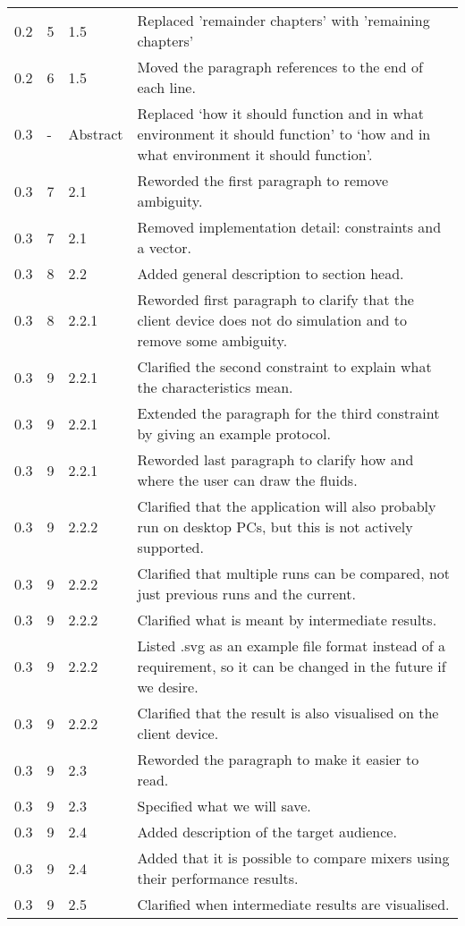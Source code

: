 \begin{tabular}{|l|l|l|p{11cm}|}
    0.2 & 5 & 1.5 & Replaced 'remainder chapters' with 'remaining chapters' \\
    0.2 & 6 & 1.5 & Moved the paragraph references to the end of each line. \\
    0.3 & - & Abstract & Replaced `how it should function and in what environment it should function' to `how and in what environment it should function'.\\
    0.3 & 7 & 2.1 & Reworded the first paragraph to remove ambiguity. \\
    0.3 & 7 & 2.1 & Removed implementation detail: constraints and a vector. \\
    0.3 & 8 & 2.2 & Added general description to section head. \\
    0.3 & 8 & 2.2.1 & Reworded first paragraph to clarify that the client device does not do simulation and to remove some ambiguity. \\
    0.3 & 9 & 2.2.1 & Clarified the second constraint to explain what the characteristics mean. \\
    0.3 & 9 & 2.2.1 & Extended the paragraph for the third constraint by giving an example protocol. \\
    0.3 & 9 & 2.2.1 & Reworded last paragraph to clarify how and where the user can draw the fluids. \\
    0.3 & 9 & 2.2.2 & Clarified that the application will also probably run on desktop PCs, but this is not actively supported. \\
    0.3 & 9 & 2.2.2 & Clarified that multiple runs can be compared, not just previous runs and the current.\\
    0.3 & 9 & 2.2.2 & Clarified what is meant by intermediate results. \\
    0.3 & 9 & 2.2.2 & Listed .svg as an example file format instead of a requirement, so it can be changed in the future if we desire. \\
    0.3 & 9 & 2.2.2 & Clarified that the result is also visualised on the client device. \\
    0.3 & 9 & 2.3 & Reworded the paragraph to make it easier to read. \\
    0.3 & 9 & 2.3 & Specified what we will save. \\
    0.3 & 9 & 2.4 & Added description of the target audience. \\
    0.3 & 9 & 2.4 & Added that it is possible to compare mixers using their performance results. \\
    0.3 & 9 & 2.5 & Clarified when intermediate results are visualised. \\

\end{tabular}
